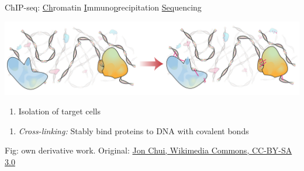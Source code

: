 \documentclass[10pt]{beamer}
\newcommand{\credit}[1]{{\vspace{\fill} \par \raggedleft \scriptsize \mdseries \color{mDarkBrown} #1 \par}}
\begin{document}
\begin{frame}{ChIP-seq: \underline{Ch}romatin \underline{I}mmuno\underline{p}recipitation \underline{Seq}uencing}
	\vspace{3em}
	\begin{center}
		\includegraphics[width=\textwidth]{./figures/ChIPseq1.png}
	\end{center}
	\begin{minipage}[t]{.49\linewidth}
		\begin{enumerate}
			\item {Isolation of target cells}
		\end{enumerate}
	\end{minipage}
	\begin{minipage}[t]{.49\linewidth}
		\begin{enumerate}
			\item { \textit{Cross-linking:} Stably bind proteins to DNA with covalent bonds}
		\end{enumerate}
	\end{minipage}
	\credit{Fig: own derivative work. Original: \href{http://commons.wikimedia.org/wiki/File:Chromatin\_immunoprecipitation\_sequencing.svg}{Jon Chui, Wikimedia Commons, CC-BY-SA 3.0}}
\end{frame}
\end{document}
